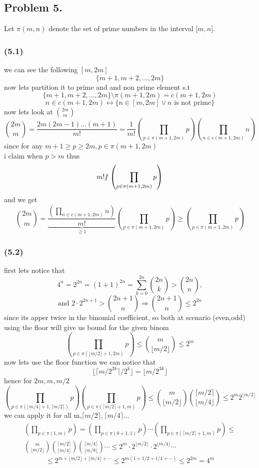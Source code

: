 \documentclass[12pt]{article}
\newcommand{\ndiv}{\hspace{-4pt}\not|\hspace{2pt}}
\begin{document}
\subsection*{Problem 5.}
Let $\pi (m, n)$ denote the set of prime numbers in the interval [$m,n$].
\subsubsection*{(5.1)}
we can see the following  $[m,2m]$
\[
\{m+1,m+2,...,2m\}
\]
now lets partition it to prime and and non prime element s.t
\[
\{m+1,m+2,...,2m\} \setminus \pi(m+1,2m)= c(m+1,2m)
\]
\[
 n \in c(m+1,2m) \leftrightarrow \{ n\in  [m,2m] \vee n \text{ is not prime} \}
\]
now lets look at $\binom{2m}{m}$
\[
\binom{2m}{m}=\frac{2m(2m-1)...(m+1)}{m!}=\frac{1}{m!} \left(\prod\limits_{p\in \pi(m+1,2m)}p\right)  \left(\prod\limits_{n\in c(m+1,2m)}n\right)\]
since for any $m+1 \geq p \geq 2m , p\in \pi(m+1,2m)$\\
i claim when $p>m$  thus 
\[
 m!  \ndiv  \left(\prod\limits_{p\in \pi(m+1,2m)}p\right)
\]
and we get 
\[\binom{2m}{m}=\underbrace{ \dfrac{\left(\prod\limits_{n\in c(m+1,2m)}n\right)}{m!}}_{\geq 1}\left(\prod\limits_{p\in \pi(m+1,2m)}p\right)
\geq \left(\prod\limits_{p\in \pi(m+1,2m)}p\right)
\]
\subsubsection*{(5.2)}
first lets notice that 
\[
4^{n}=2^{2n}=(1+1)^{2n}=\sum^{2n}_{k=0}\binom{2n}{k} > \binom{2n}{n},\]
\[
\text{and }2\cdot 2^{2n+1} > \binom{2n+1}{n} 
\Rightarrow \binom{2n+1}{n} \leq 2^{2n}
\]
since its apper twice in the binomial coefficient, 
 so both at scenario (even,odd) using the floor will give us bound for the given binom 
\[
 \left(\prod\limits_{p\in \pi(\lfloor m/2 \rfloor +1,2m)}p\right)\leq \binom{m}{\lfloor m/2 \rfloor} \leq 2^m
\] 
now lets use the floor function we can notice that
 \[\lfloor \lceil m/2^{2k} \rceil/2^k \rfloor =\lfloor m /2^{3k}\rfloor \]
 hence for $2m,m,m/2$
\[
 \left(\prod\limits_{p\in \pi(\lfloor m/4 \rfloor +1,\lceil m/2 \rceil )}p\right)\left(\prod\limits_{p\in \pi(\lceil m/2 \rceil+1,m)}p\right)\leq \binom{m}{\lfloor m/2 \rfloor}\binom{\lceil m/2 \rceil}{\lfloor m/4 \rfloor}\leq 2^m2^{\lfloor m/2 \rfloor}
\]
we can apply  it for all m,$\lceil m/2 \rceil,\lceil m/4 \rceil $...
\begin{align}
\left(\prod\limits_{p\in \pi(1,m)}p\right)= \left(\prod\limits_{p\in \pi(0+1,1)}p\right)\cdots \left(\prod\limits_{p\in \pi(\lceil m/2 \rceil+1,m)}p\right) \leq
\\
{m \choose {\lfloor m/2 \rfloor}}{{\lceil m/2 \rceil} \choose {\lfloor m/4 \rfloor}}{{\lceil m/4 \rceil} \choose {\lfloor m/8 \rfloor}}\cdots \leq   2^m\cdot 2^{{\lfloor m/2 \rfloor}} \cdot  2^{{\lfloor m/4 \rfloor}} \cdots
\end{align}
\[ \leq 2^{m + {\lfloor m/2 \rfloor} + {\lfloor m/4 \rfloor} + \cdots } \leq 2^{m(1 + 1/2 + 1/4 + \cdots) } \leq  2^{2m} = 4^m
\]
\end{document}
